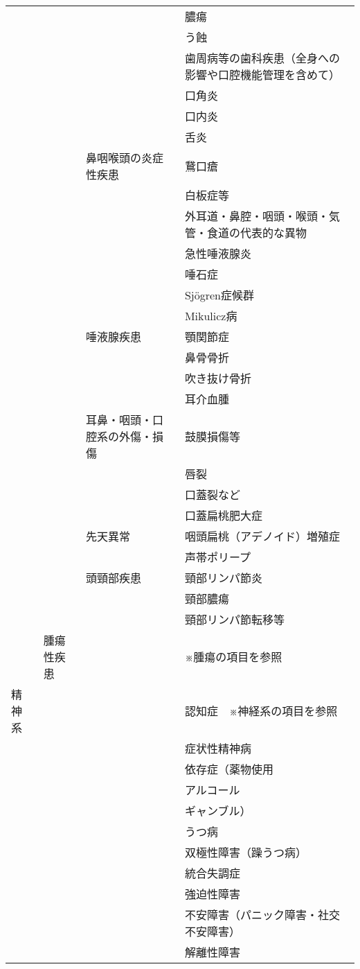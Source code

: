 \begin{xltabular}{\linewidth}{XXXX}
 &  &  & 膿瘍 \\
 &  &  & う蝕 \\
 &  &  & 歯周病等の歯科疾患（全身への影響や口腔機能管理を含めて） \\
 &  &  & 口角炎 \\
 &  &  & 口内炎 \\
 &  &  & 舌炎 \\
 &  & 鼻咽喉頭の炎症性疾患 & 鵞口瘡 \\
 &  &  & 白板症等 \\
 &  &  & 外耳道・鼻腔・咽頭・喉頭・気管・食道の代表的な異物 \\
 &  &  & 急性唾液腺炎 \\
 &  &  & 唾石症 \\
 &  &  & Sjögren症候群 \\
 &  &  & Mikulicz病 \\
 &  & 唾液腺疾患 & 顎関節症 \\
 &  &  & 鼻骨骨折 \\
 &  &  & 吹き抜け骨折 \\
 &  &  & 耳介血腫 \\
 &  & 耳鼻・咽頭・口腔系の外傷・損傷 & 鼓膜損傷等 \\
 &  &  & 唇裂 \\
 &  &  & 口蓋裂など \\
 &  &  & 口蓋扁桃肥大症 \\
 &  & 先天異常 & 咽頭扁桃（アデノイド）増殖症 \\
 &  &  & 声帯ポリープ \\
 &  & 頭頸部疾患 & 頸部リンパ節炎 \\
 &  &  & 頸部膿瘍 \\
 &  &  & 頸部リンパ節転移等 \\
 & 腫瘍性疾患 &  & ※腫瘍の項目を参照 \\
精神系 &  &  & 認知症　※神経系の項目を参照 \\
 &  &  & 症状性精神病 \\
 &  &  & 依存症（薬物使用 \\
 &  &  & アルコール \\
 &  &  & ギャンブル） \\
 &  &  & うつ病 \\
 &  &  & 双極性障害（躁うつ病） \\
 &  &  & 統合失調症 \\
 &  &  & 強迫性障害 \\
 &  &  & 不安障害（パニック障害・社交不安障害） \\
 &  &  & 解離性障害 \\

\end{xltabular}
